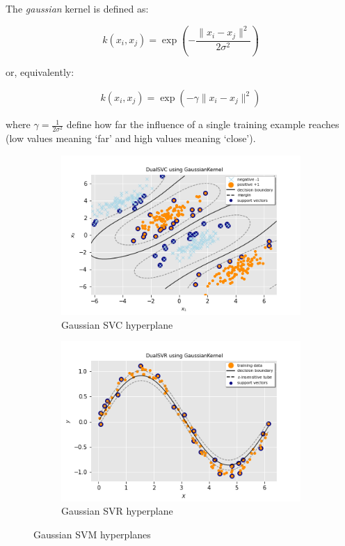 The \emph{gaussian} kernel is defined as:

\begin{equation} \label{eq:gaussian_kernel1}
	k(x_i,x_j)=\exp(-\frac{\|x_i-x_j\|^2}{2\sigma^2})
\end{equation}

or, equivalently:

\begin{equation} \label{eq:gaussian_kernel2}
	k(x_i,x_j)=\exp(-\gamma \|x_i-x_j\|^2)
\end{equation}

where $\displaystyle \gamma=\frac{1}{2\sigma^2}$ define how far the influence of a single training example reaches (low values meaning ‘far’ and high values meaning ‘close’).

\begin{figure}[h!]
	\centering
	\begin{subfigure}{.49\textwidth}
		\centering
		\includegraphics[width=\textwidth]{img/gaussian_dual_svc_hyperplane.png}
		\caption{Gaussian SVC hyperplane}
		\label{fig:gaussian_dual_svc_hyperplane}
	\end{subfigure}
	\begin{subfigure}{.49\textwidth}
		\centering
		\captionsetup{justification=centering}
		\includegraphics[width=\textwidth]{img/gaussian_dual_svr_hyperplane.png}
		\caption{Gaussian SVR hyperplane}
		\label{fig:gaussian_dual_svr_hyperplane}
	\end{subfigure}
\caption{Gaussian SVM hyperplanes}
\end{figure}